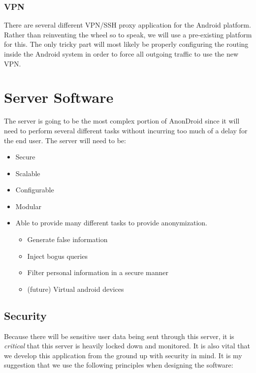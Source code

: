 \documentclass[a4paper]{article}
\begin{document}
\subsubsection{VPN}

There are several different VPN/SSH proxy application for the Android platform.
Rather than reinventing the wheel so to speak, we will use a pre-existing
platform for this. The only tricky part will most likely be properly
configuring the routing inside the Android system in order to force all
outgoing traffic to use the new VPN.

\section{Server Software}

The server is going to be the most complex portion of AnonDroid since it will
need to perform several different tasks without incurring too much of a delay for the end user. The server will need to be:

\begin{itemize}
\item Secure
\item Scalable
\item Configurable
\item Modular
\item Able to provide many different tasks to provide anonymization.
  \begin{itemize}
    \item Generate false information
    \item Inject bogus queries
    \item Filter personal information in a secure manner
    \item (future) Virtual android devices
  \end{itemize}

\end{itemize}

\subsection{Security}

Because there will be sensitive user data being sent through this server, it is
\emph{critical} that this server is heavily locked down and monitored. It is
also vital that we develop this application from the ground up with security in
mind. It is my suggestion that we use the following principles when designing the software:
\end{document}
